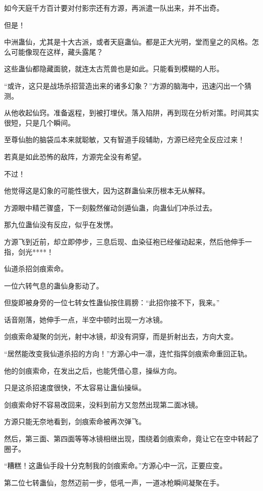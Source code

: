 \begin{this_body}
如今天庭千方百计要对付影宗还有方源，再派遣一队出来，并不出奇。

但是！

中洲蛊仙，尤其是十大古派，或者天庭蛊仙。都是正大光明，堂而皇之的风格。怎么可能像现在这样，藏头露尾？

这些蛊仙都隐藏面貌，就连太古荒兽也是如此。只能看到模糊的人形。

“或许，这只是战场杀招营造出来的诸多幻象？”方源的脑海中，迅速闪出一个猜测。

从他收起仙窍。准备返程，到被打埋伏。落入陷阱，再到现在分析对策。时间其实很短，只是几个瞬间。

至尊仙胎的脑袋瓜本来就聪敏，又有智道手段辅助，方源已经完全反应过来！

若真是如此恐怖的敌阵，方源完全没有希望。

不过！

他觉得这是幻象的可能性很大，因为这群蛊仙来历根本无从解释。

方源眼中精芒骤盛，下一刻毅然催动剑遁仙蛊，向蛊仙们冲杀过去。

那九位蛊仙没有反应，似乎在发愣。

方源飞到近前，却立即停步，三息后现、血染征袍已经催动起来，然后他伸手一指，剑光****！

仙道杀招剑痕索命。

一位六转气息的蛊仙身影动了。

但旋即被身旁的一位七转女性蛊仙按住肩膀：“此招你接不下，我来。”

话音刚落，她伸手一点，半空中顿时出现一方冰镜。

剑痕索命凝聚的剑光，射中冰镜，却没有洞穿，而是折射出去，方向大变。

“居然能改变我仙道杀招的方向！”方源心中一凛，连忙指挥剑痕索命重回正轨。

他的剑痕索命，在发出之后，也能凭借心意，操纵方向。

只是这杀招速度很快，不太容易让蛊仙操纵。

剑痕索命好不容易改回来，没料到前方又忽然出现第二面冰镜。

方源只能无奈地看到，剑痕索命被再次弹飞。

然后，第三面、第四面等等冰镜相继出现，围绕着剑痕索命，竟让它在空中转起了圈子。

“糟糕！这蛊仙手段十分克制我的剑痕索命。”方源心中一沉，正要应变。

第二位七转蛊仙，忽然迈前一步，低吼一声，一道冰枪瞬间凝聚在手。


\end{this_body}
